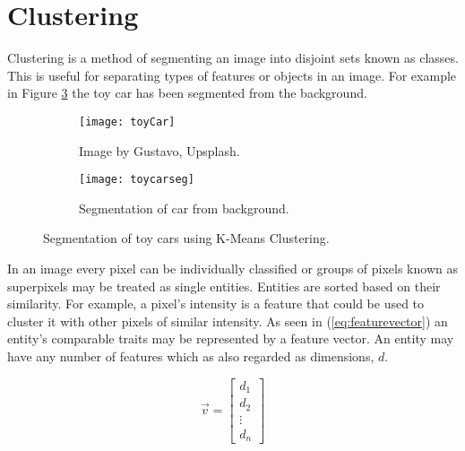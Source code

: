 \section{Clustering}
Clustering is a method of segmenting an image into disjoint sets known as classes. This is useful for separating types of features or objects in an image. For example in Figure \ref{fig:toycar} the toy car has been segmented from the background.

\begin{figure}[H]
	\centering
	\begin{subfigure}[b]{0.5\linewidth}
      		\centering\texttt{[image: toyCar]}
      		\caption{Image by Gustavo, Upsplash.}
		    \label{fig:toycarA}
    	\end{subfigure}%
    	\begin{subfigure}[b]{0.5\linewidth}
      		\centering\texttt{[image: toycarseg]}
      		\caption{Segmentation of car from background.}
       		\label{fig:toycarB}
    	\end{subfigure}
    	\caption{Segmentation of toy cars using K-Means Clustering.}
    	\label{fig:toycar}
\end{figure} 

In an image every pixel can be individually classified or groups of pixels known as superpixels may be treated as single entities. Entities are sorted based on their similarity. For example, a pixel's intensity is a feature that could be used to cluster it with other pixels of similar intensity. As seen in (\ref{eq:featurevector}) an entity's comparable traits may be represented by a feature vector. An entity may have any number of features which as also regarded as dimensions, $d$. 

\begin{equation}
    \vec{v} = 
    \begin{bmatrix}
        d_1 \\
        d_2 \\
        \vdots \\ 
        d_n
    \end{bmatrix}
    \label{eq:featurevector}
\end{equation}





